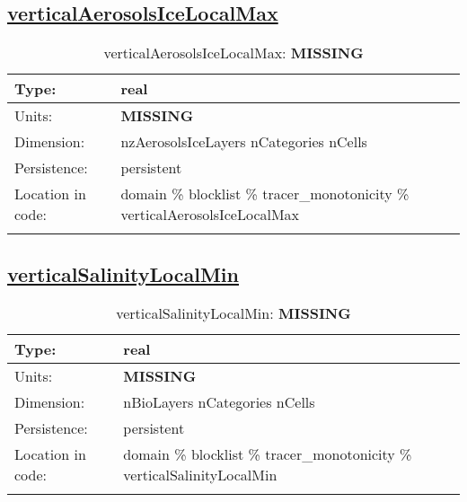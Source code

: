 \subsection[verticalAerosolsIceLocalMax]{\hyperref[sec:var_tab_tracer_monotonicity]{verticalAerosolsIceLocalMax}}
\label{subsec:var_sec_tracer_monotonicity_verticalAerosolsIceLocalMax}
\begin{center}
\begin{longtable}{| p{2.0in} | p{4.0in} |}
        \hline 
        Type: & real \\
        \hline 
        Units: & {\bf \color{red} MISSING} \\
        \hline 
        Dimension: & nzAerosolsIceLayers nCategories nCells \\
        \hline 
        Persistence: & persistent \\
        \hline 
         Location in code: & domain \% blocklist \% tracer\_monotonicity \% verticalAerosolsIceLocalMax \\
         \hline 
    \caption{verticalAerosolsIceLocalMax: {\bf \color{red} MISSING}}
\end{longtable}
\end{center}
\subsection[verticalSalinityLocalMin]{\hyperref[sec:var_tab_tracer_monotonicity]{verticalSalinityLocalMin}}
\label{subsec:var_sec_tracer_monotonicity_verticalSalinityLocalMin}
\begin{center}
\begin{longtable}{| p{2.0in} | p{4.0in} |}
        \hline 
        Type: & real \\
        \hline 
        Units: & {\bf \color{red} MISSING} \\
        \hline 
        Dimension: & nBioLayers nCategories nCells \\
        \hline 
        Persistence: & persistent \\
        \hline 
         Location in code: & domain \% blocklist \% tracer\_monotonicity \% verticalSalinityLocalMin \\
         \hline 
    \caption{verticalSalinityLocalMin: {\bf \color{red} MISSING}}
\end{longtable}
\end{center}
